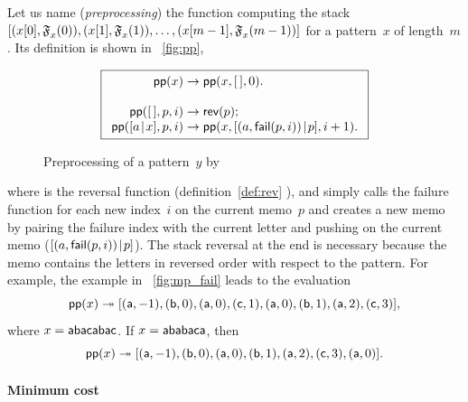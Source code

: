 Let us name  (\emph{preprocessing}) the
function computing the stack \([({{x}[{0}]},{\mathfrak{F}_{x}^{}(0)}),
({{x}[{1}]},{\mathfrak{F}_{x}^{}(1)}), \dots,
({{x}[{m-1}]},{\mathfrak{F}_{x}^{}(m-1)})]\) for a pattern~\(x\) of
length~\(m\). Its definition is shown in \fig~\vref{fig:pp},
\begin{figure}[t]
\begin{equation*}
\boxed{%
\begin{array}{r@{\;}l@{\;}l}
\fun{pp}(x) & \rightarrow & \fun{pp}(x,\el,0).\\
\\
\fun{pp}(\el,p,i) & \rightarrow & \fun{rev}(p);\\
\fun{pp}(\cons{a}{x},p,i)
  & \rightarrow
  & \fun{pp}(x,\cons{\pair{a}{\fun{fail}(p,i)}}{p},i+1).
\end{array}}
\end{equation*}
\caption{Preprocessing of a pattern~\(y\) by }
\label{fig:pp}
\end{figure}
where  is the reversal function
(definition~\eqref{def:rev} ), and
 simply calls the failure function
 for each new index~\(i\) on the current memo~\(p\) and
creates a new memo by pairing the failure index with the current
letter and pushing on the current memo
(\([{({a},{\textsf{fail}(p,i)})}\!\mid\!{p}]\)). The stack reversal at the
end is necessary because the memo contains the letters in reversed
order with respect to the pattern. For example, the example in
\fig~\vref{fig:mp_fail} leads to the evaluation
\begin{equation*}
\textsf{pp}(x) \twoheadrightarrow
[({\textsf{a}},{-1}), ({\textsf{b}},{0}),
({\textsf{a}},{0}), ({\textsf{c}},{1}),
({\textsf{a}},{0}), ({\textsf{b}},{1}),
({\textsf{a}},{2}), ({\textsf{c}},{3})],
\end{equation*}
where \(x=\textsf{abacabac}\). If \(x=\textsf{ababaca}\), then
\begin{equation*}
\belowdisplayskip=0pt
\fun{pp}(x) \twoheadrightarrow
[\pair{\word{a}}{-1}, \pair{\word{b}}{0},
\pair{\word{a}}{0}, \pair{\word{b}}{1},
\pair{\word{a}}{2}, \pair{\word{c}}{3},
\pair{\word{a}}{0}].
\end{equation*}

\paragraph{Minimum cost}

